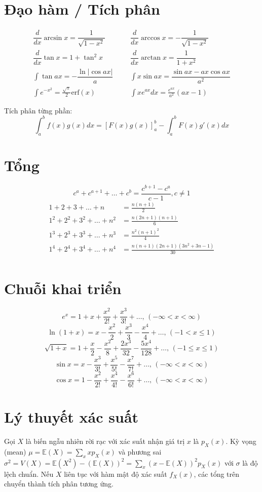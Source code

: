 \section{Đạo hàm / Tích phân}
\begin{align*}
	\dfrac{d}{dx}\arcsin x = \dfrac{1}{\sqrt{1-x^2}} &&& \dfrac{d}{dx}\arccos x = -\dfrac{1}{\sqrt{1-x^2}} \\
	\dfrac{d}{dx}\tan x = 1+\tan^2 x &&& \dfrac{d}{dx}\arctan x = \dfrac{1}{1+x^2} \\
	\int\tan ax = -\dfrac{\ln|\cos ax|}{a} &&& \int x\sin ax = \dfrac{\sin ax-ax \cos ax}{a^2} \\
	\int e^{-x^2} = \frac{\sqrt \pi}{2} \text{erf}(x) &&& \int xe^{ax}dx = \frac{e^{ax}}{a^2}(ax-1)
\end{align*}

Tích phân từng phần:
\[\int_a^bf(x)g(x)dx = [F(x)g(x)]_a^b-\int_a^bF(x)g'(x)dx\]

\section{Tổng}
\[ c^a + c^{a+1} + \dots + c^{b} = \frac{c^{b+1} - c^a}{c-1}, c \neq 1 \]
\begin{align*}
	1 + 2 + 3 + \dots + n &= \frac{n(n+1)}{2} \\
	1^2 + 2^2 + 3^2 + \dots + n^2 &= \frac{n(2n+1)(n+1)}{6} \\
	1^3 + 2^3 + 3^3 + \dots + n^3 &= \frac{n^2(n+1)^2}{4} \\
	1^4 + 2^4 + 3^4 + \dots + n^4 &= \frac{n(n+1)(2n+1)(3n^2 + 3n - 1)}{30} \\
\end{align*}

\section{Chuỗi khai triển}
$$e^x = 1+x+\frac{x^2}{2!}+\frac{x^3}{3!}+\dots,\,(-\infty<x<\infty)$$
$$\ln(1+x) = x-\frac{x^2}{2}+\frac{x^3}{3}-\frac{x^4}{4}+\dots,\,(-1<x\leq1)$$
$$\sqrt{1+x} = 1+\frac{x}{2}-\frac{x^2}{8}+\frac{2x^3}{32}-\frac{5x^4}{128}+\dots,\,(-1\leq x\leq1)$$
$$\sin x = x-\frac{x^3}{3!}+\frac{x^5}{5!}-\frac{x^7}{7!}+\dots,\,(-\infty<x<\infty)$$
$$\cos x = 1-\frac{x^2}{2!}+\frac{x^4}{4!}-\frac{x^6}{6!}+\dots,\,(-\infty<x<\infty)$$

\section{Lý thuyết xác suất}
Gọi $X$ là biến ngẫu nhiên rời rạc với xác suất nhận giá trị $x$ là $p_X(x)$. Kỳ vọng (mean) $\mu=\mathbb{E}(X)=\sum_xxp_X(x)$ và phương sai $\sigma^2=V(X)=\mathbb{E}(X^2)-(\mathbb{E}(X))^2=\sum_x(x-\mathbb{E}(X))^2p_X(x)$ với $\sigma$ là độ lệch chuẩn. Nếu $X$ liên tục với hàm mật độ xác suất $f_X(x)$, các tổng trên chuyển thành tích phân tương ứng.

